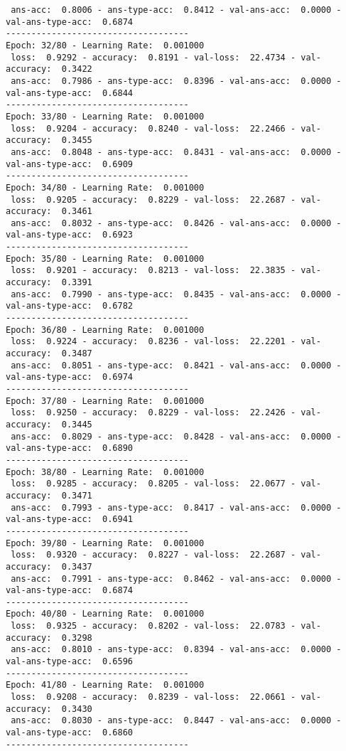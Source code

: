\documentclass{report}
\begin{document}
\begin{verbatim}
 ans-acc:  0.8006 - ans-type-acc:  0.8412 - val-ans-acc:  0.0000 - val-ans-type-acc:  0.6874
------------------------------------
Epoch: 32/80 - Learning Rate:  0.001000
 loss:  0.9292 - accuracy:  0.8191 - val-loss:  22.4734 - val-accuracy:  0.3422
 ans-acc:  0.7986 - ans-type-acc:  0.8396 - val-ans-acc:  0.0000 - val-ans-type-acc:  0.6844
------------------------------------
Epoch: 33/80 - Learning Rate:  0.001000
 loss:  0.9204 - accuracy:  0.8240 - val-loss:  22.2466 - val-accuracy:  0.3455
 ans-acc:  0.8048 - ans-type-acc:  0.8431 - val-ans-acc:  0.0000 - val-ans-type-acc:  0.6909
------------------------------------
Epoch: 34/80 - Learning Rate:  0.001000
 loss:  0.9205 - accuracy:  0.8229 - val-loss:  22.2687 - val-accuracy:  0.3461
 ans-acc:  0.8032 - ans-type-acc:  0.8426 - val-ans-acc:  0.0000 - val-ans-type-acc:  0.6923
------------------------------------
Epoch: 35/80 - Learning Rate:  0.001000
 loss:  0.9201 - accuracy:  0.8213 - val-loss:  22.3835 - val-accuracy:  0.3391
 ans-acc:  0.7990 - ans-type-acc:  0.8435 - val-ans-acc:  0.0000 - val-ans-type-acc:  0.6782
------------------------------------
Epoch: 36/80 - Learning Rate:  0.001000
 loss:  0.9224 - accuracy:  0.8236 - val-loss:  22.2201 - val-accuracy:  0.3487
 ans-acc:  0.8051 - ans-type-acc:  0.8421 - val-ans-acc:  0.0000 - val-ans-type-acc:  0.6974
------------------------------------
Epoch: 37/80 - Learning Rate:  0.001000
 loss:  0.9250 - accuracy:  0.8229 - val-loss:  22.2426 - val-accuracy:  0.3445
 ans-acc:  0.8029 - ans-type-acc:  0.8428 - val-ans-acc:  0.0000 - val-ans-type-acc:  0.6890
------------------------------------
Epoch: 38/80 - Learning Rate:  0.001000
 loss:  0.9285 - accuracy:  0.8205 - val-loss:  22.0677 - val-accuracy:  0.3471
 ans-acc:  0.7993 - ans-type-acc:  0.8417 - val-ans-acc:  0.0000 - val-ans-type-acc:  0.6941
------------------------------------
Epoch: 39/80 - Learning Rate:  0.001000
 loss:  0.9320 - accuracy:  0.8227 - val-loss:  22.2687 - val-accuracy:  0.3437
 ans-acc:  0.7991 - ans-type-acc:  0.8462 - val-ans-acc:  0.0000 - val-ans-type-acc:  0.6874
------------------------------------
Epoch: 40/80 - Learning Rate:  0.001000
 loss:  0.9325 - accuracy:  0.8202 - val-loss:  22.0783 - val-accuracy:  0.3298
 ans-acc:  0.8010 - ans-type-acc:  0.8394 - val-ans-acc:  0.0000 - val-ans-type-acc:  0.6596
------------------------------------
Epoch: 41/80 - Learning Rate:  0.001000
 loss:  0.9208 - accuracy:  0.8239 - val-loss:  22.0661 - val-accuracy:  0.3430
 ans-acc:  0.8030 - ans-type-acc:  0.8447 - val-ans-acc:  0.0000 - val-ans-type-acc:  0.6860
------------------------------------

\end{verbatim}
\end{document}
